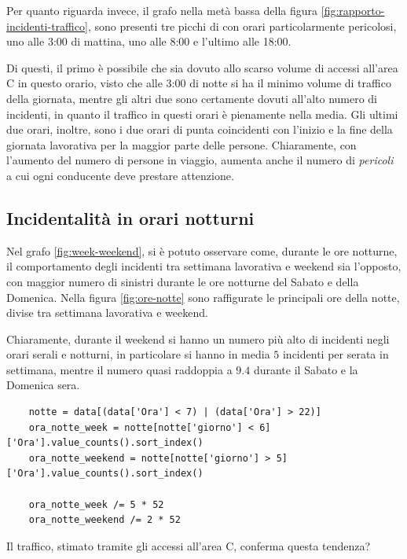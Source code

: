\documentclass[a4paper,12pt]{report}
\newcommand{\quotestyle}[1]{\textit{#1}}
\begin{document}
Per quanto riguarda invece, il grafo nella metà bassa della 
figura \ref{fig:rapporto-incidenti-traffico}, sono presenti tre picchi di 
con orari particolarmente pericolosi, uno alle 3:00 di mattina, uno alle 
8:00 e l'ultimo alle 18:00. 

Di questi, il primo è possibile che sia dovuto allo scarso volume di accessi 
all'area C in questo orario, visto che alle 3:00 di notte si ha il minimo volume di 
traffico della giornata, mentre gli altri due sono certamente dovuti all'alto 
numero di incidenti, in quanto il traffico in questi orari è pienamente nella media.
Gli ultimi due orari, inoltre, sono i due orari di punta coincidenti con l'inizio 
e la fine della giornata lavorativa per la maggior parte delle persone. 
Chiaramente, con l'aumento del numero di persone in viaggio, aumenta anche il 
numero di \quotestyle{pericoli} a cui ogni conducente deve prestare attenzione.

\subsection{Incidentalità in orari notturni}

Nel grafo \ref{fig:week-weekend}, si è potuto osservare come, durante le 
ore notturne, il comportamento degli incidenti tra settimana lavorativa e weekend 
sia l'opposto, con maggior numero di sinistri durante le ore notturne del 
Sabato e della Domenica.
Nella figura \ref{fig:ore-notte} sono raffigurate le principali ore della notte, divise tra 
settimana lavorativa e weekend.

Chiaramente, durante il weekend si hanno un numero più alto di incidenti negli orari serali e 
notturni, in particolare si hanno in media $5$ incidenti per serata in settimana, mentre il numero 
quasi raddoppia a $9.4$ durante il Sabato e la Domenica sera.

\begin{lstlisting}
    notte = data[(data['Ora'] < 7) | (data['Ora'] > 22)]
    ora_notte_week = notte[notte['giorno'] < 6]['Ora'].value_counts().sort_index()
    ora_notte_weekend = notte[notte['giorno'] > 5]['Ora'].value_counts().sort_index()

    ora_notte_week /= 5 * 52 
    ora_notte_weekend /= 2 * 52
\end{lstlisting}

Il traffico, stimato tramite gli accessi all'area C, conferma questa tendenza?
\end{document}
